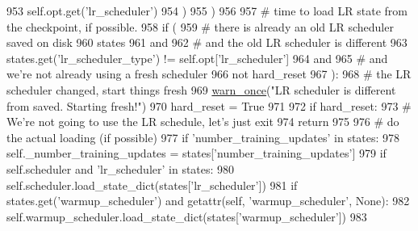 \begin{DoxyCode}
953                     self.opt.get(\textcolor{stringliteral}{'lr\_scheduler'})
954                 )
955             )
956 
957         \textcolor{comment}{# time to load LR state from the checkpoint, if possible.}
958         \textcolor{keywordflow}{if} (
959             \textcolor{comment}{# there is already an old LR scheduler saved on disk}
960             states
961             \textcolor{keywordflow}{and}
962             \textcolor{comment}{# and the old LR scheduler is different}
963             states.get(\textcolor{stringliteral}{'lr\_scheduler\_type'}) != self.opt[\textcolor{stringliteral}{'lr\_scheduler'}]
964             \textcolor{keywordflow}{and}
965             \textcolor{comment}{# and we're not already using a fresh scheduler}
966             \textcolor{keywordflow}{not} hard\_reset
967         ):
968             \textcolor{comment}{# the LR scheduler changed, start things fresh}
969             \hyperlink{namespaceparlai_1_1utils_1_1misc_a884a3aefa90581f53bc592fa6a78dc43}{warn\_once}(\textcolor{stringliteral}{"LR scheduler is different from saved. Starting fresh!"})
970             hard\_reset = \textcolor{keyword}{True}
971 
972         \textcolor{keywordflow}{if} hard\_reset:
973             \textcolor{comment}{# We're not going to use the LR schedule, let's just exit}
974             \textcolor{keywordflow}{return}
975 
976         \textcolor{comment}{# do the actual loading (if possible)}
977         \textcolor{keywordflow}{if} \textcolor{stringliteral}{'number\_training\_updates'} \textcolor{keywordflow}{in} states:
978             self.\_number\_training\_updates = states[\textcolor{stringliteral}{'number\_training\_updates'}]
979         \textcolor{keywordflow}{if} self.scheduler \textcolor{keywordflow}{and} \textcolor{stringliteral}{'lr\_scheduler'} \textcolor{keywordflow}{in} states:
980             self.scheduler.load\_state\_dict(states[\textcolor{stringliteral}{'lr\_scheduler'}])
981         \textcolor{keywordflow}{if} states.get(\textcolor{stringliteral}{'warmup\_scheduler'}) \textcolor{keywordflow}{and} getattr(self, \textcolor{stringliteral}{'warmup\_scheduler'}, \textcolor{keywordtype}{None}):
982             self.warmup\_scheduler.load\_state\_dict(states[\textcolor{stringliteral}{'warmup\_scheduler'}])
983 
\end{DoxyCode}
\mbox{\label{classparlai_1_1core_1_1torch__agent_1_1TorchAgent_a9a21fa33fa5b2b928024fbc67826f233}} 

